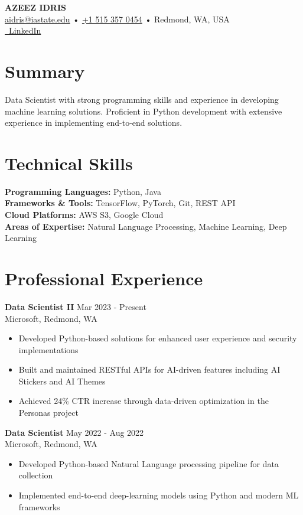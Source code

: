 \documentclass[11pt]{article}
\begin{document}
\begin{center}
    {\Huge \textbf{AZEEZ IDRIS}}\\[0.5em]
    \href{mailto:aidris@iastate.edu}{aidris@iastate.edu} • 
    \href{tel:+15153570454}{+1 515 357 0454} •
    Redmond, WA, USA\\
    \href{https://www.linkedin.com/in/azibit/}{\faLinkedin\ LinkedIn}
\end{center}

\section{Summary}
Data Scientist with strong programming skills and experience in developing machine learning solutions. Proficient in Python development with extensive experience in implementing end-to-end solutions.

\section{Technical Skills}
\textbf{Programming Languages:} Python, Java\\
\textbf{Frameworks \& Tools:} TensorFlow, PyTorch, Git, REST API\\
\textbf{Cloud Platforms:} AWS S3, Google Cloud\\
\textbf{Areas of Expertise:} Natural Language Processing, Machine Learning, Deep Learning

\section{Professional Experience}
\textbf{Data Scientist II} \hfill Mar 2023 - Present\\
Microsoft, Redmond, WA
\begin{itemize}[leftmargin=*]
    \item Developed Python-based solutions for enhanced user experience and security implementations
    \item Built and maintained RESTful APIs for AI-driven features including AI Stickers and AI Themes
    \item Achieved 24\% CTR increase through data-driven optimization in the Personas project
\end{itemize}

\textbf{Data Scientist} \hfill May 2022 - Aug 2022\\
Microsoft, Redmond, WA
\begin{itemize}[leftmargin=*]
    \item Developed Python-based Natural Language processing pipeline for data collection
    \item Implemented end-to-end deep-learning models using Python and modern ML frameworks
\end{itemize}
\end{document}
